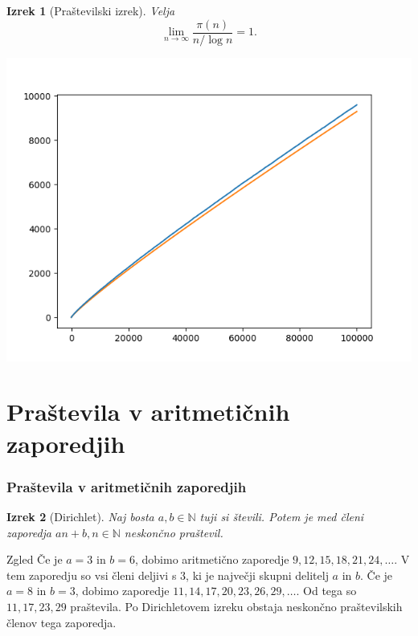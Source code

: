 \documentclass{beamer}
\newtheorem{izrek}{Izrek}
\def\N{\mathbb{N}}
\begin{document}

\begin{frame}
    \begin{izrek}[Praštevilski izrek]
        Velja $$\lim_{n \rightarrow \infty} \frac{\pi(n)}{n / \log{n}} = 1.$$
    \end{izrek}
\end{frame}


\begin{frame}
    \centering
    \includegraphics[height=0.95\textheight]{prime_number_theorem.png}
\end{frame}


\section{Praštevila v aritmetičnih zaporedjih}
\begin{frame}
    \frametitle{Praštevila v aritmetičnih zaporedjih}
    \begin{izrek}[Dirichlet]
        Naj bosta $a, b \in \N$ tuji si števili. Potem je med členi zaporedja $an + b, n \in \N$ neskončno praštevil.
    \end{izrek}
    \pause
    \begin{exampleblock}{Zgled}
        Če je $a = 3$ in $b = 6$, dobimo aritmetično zaporedje $9, 12, 15, 18, 21, 24, \ldots$. V tem zaporedju so vsi členi deljivi s $3$, ki je največji skupni delitelj $a$ in $b$.
        \medskip
        Če je $a = 8$ in $b = 3$, dobimo zaporedje $11, 14, 17, 20, 23, 26, 29, \ldots$. Od tega so $11, 17, 23, 29$ praštevila. Po Dirichletovem izreku obstaja neskončno praštevilskih členov tega zaporedja.
    \end{exampleblock}
\end{frame}
\end{document}
